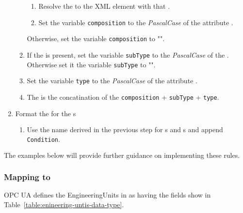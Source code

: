 \begin{enumerate}
\begin{enumerate}
\begin{enumerate}
        \item Resolve the  to the  XML element with that .
        \item Set the variable \texttt{composition} to the \textit{PascalCase} of the  attribute .
        \end{enumerate}
        Otherwise, set the variable \texttt{composition} to "".
    \item If the  is present, set the variable \texttt{subType} to the \textit{PascalCase} of the . Otherwise set it the variable \texttt{subType} to "".
    \item Set the variable \texttt{type} to the \textit{PascalCase} of the  attribute .
    \item The  is the concatination of the \texttt{composition} + \texttt{subType} + \texttt{type}.
    \end{enumerate}
\item Format the  for the  s
    \begin{enumerate}
    \item Use the name derived in the previous step for s and s and append \texttt{Condition}. 
    \end{enumerate}
\end{enumerate}

The examples below will provide further guidance on implementing these rules.

\subsubsection{Mapping   to }

OPC UA defines the EngineeringUnits  in \cite{UAPart8} as having the fields show in Table~\ref{table:enineering-untis-data-type}.

